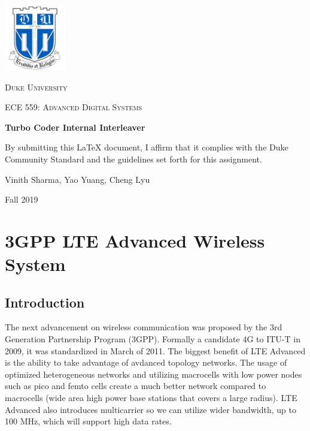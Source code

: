 \documentclass[letterpaper, 12pt]{article} %
\begin{document}
\begin{titlepage}
	\centering
	\includegraphics[width=0.2\textwidth]{Images/Duke_logo.png}\par\vspace{1cm}
	{\scshape\LARGE Duke University \par}
	\vspace{1cm}
	{\scshape\Large ECE 559: Advanced Digital Systems \par}
	\vspace{1.5cm}
	{\huge\bfseries Turbo Coder Internal Interleaver \par}
	\vspace{2cm}
   {By submitting this \LaTeX{} document, I affirm that it complies with the Duke Community Standard and the guidelines set forth for this assignment.\par}
   \vspace{1cm}
	{\Large Vinith Sharma, Yao Yuang, Cheng Lyu}
	\vfill
	{\large Fall 2019\par}
\end{titlepage}


\newpage
\section{3GPP LTE Advanced Wireless System}
    \subsection{Introduction}
        The next advancement on wireless communication was proposed by the 3rd Generation Partnership Program (3GPP). Formally a candidate 4G to ITU-T in 2009, it was standardized in March of 2011.
        The biggest benefit of LTE Advanced is the ability to take advantage of avdanced topology networks. The usage of optimized heterogeneous networks and utilizing macrocells with low power nodes such as pico and femto cells create a much better network compared to macrocells (wide area high power base stations that covers a large radius). LTE Advanced also introduces multicarrier so we can utilize wider bandwidth, up to 100 MHz, which will support high data rates.
\end{document}
